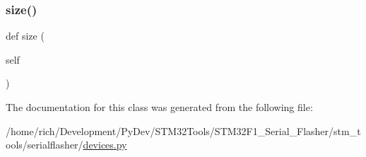 \mbox{\label{classstm__tools_1_1serialflasher_1_1devices_1_1Region_a6d620a10dad91cadcb542e6098ada619}} 
\subsubsection{\texorpdfstring{size()}{size()}}
{\footnotesize\ttfamily def size (\begin{DoxyParamCaption}\item[{}]{self }\end{DoxyParamCaption})}



The documentation for this class was generated from the following file\+:\begin{DoxyCompactItemize}
\item 
/home/rich/\+Development/\+Py\+Dev/\+S\+T\+M32\+Tools/\+S\+T\+M32\+F1\+\_\+\+Serial\+\_\+\+Flasher/stm\+\_\+tools/serialflasher/\hyperlink{devices_8py}{devices.\+py}\end{DoxyCompactItemize}
